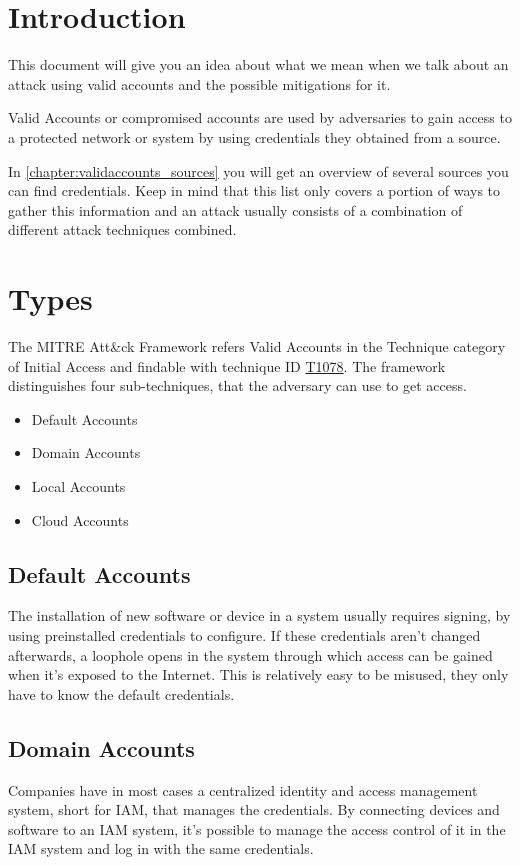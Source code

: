 \chapter{Introduction}
This document will give you an idea about what we mean when we talk about an attack using valid accounts and the possible mitigations for it.

Valid Accounts or compromised accounts are used by adversaries to gain access to a protected network or system by using credentials they obtained from a source.

In \autoref{chapter:validaccounts_sources} you will get an overview of several sources you can find credentials.
Keep in mind that this list only covers a portion of ways to gather this information and an attack usually consists of a combination of different attack techniques combined.

\chapter{Types}
The MITRE Att\&ck Framework refers Valid Accounts in the Technique category of Initial Access and findable with technique ID \href{https://attack.mitre.org/techniques/T1078/}{T1078}.
The framework distinguishes four sub-techniques, that the adversary can use to get access.

\begin{itemize}
    \item Default Accounts
    \item Domain Accounts
    \item Local Accounts
    \item Cloud Accounts
\end{itemize}

\section{Default Accounts}
The installation of new software or device in a system usually requires signing, by using preinstalled credentials to configure.
If these credentials aren't changed afterwards, a loophole opens in the system through which access can be gained when it's exposed to the Internet.
This is relatively easy to be misused, they only have to know the default credentials.

\section{Domain Accounts}
Companies have in most cases a centralized identity and access management system, short for IAM, that manages the credentials.
By connecting devices and software to an IAM system, it's possible to manage the access control of it in the IAM system and log in with the same credentials.

